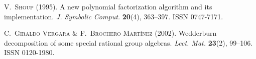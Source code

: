 \begin{thebibliography}{36}
\textsc{V.~Shoup} (1995).
\newblock A new polynomial factorization algorithm and its implementation.
\newblock \emph{J. Symbolic Comput.} \textbf{20}(4), 363--397.
\newblock ISSN 0747-7171.

\textsc{C.~Giraldo Vergara} \& \textsc{F.~Brochero Mart\'inez} (2002).
\newblock Wedderburn decomposition of some special rational group algebras.
\newblock \emph{Lect. Mat.} \textbf{23}(2), 99--106.
\newblock ISSN 0120-1980.

\end{thebibliography}


  




